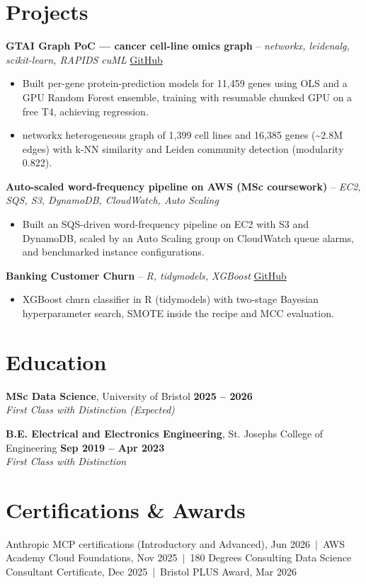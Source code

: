 \documentclass[a4paper,11pt]{article}
\begin{document}
\section{Projects}
\noindent\textbf{GTAI Graph PoC — cancer cell-line omics graph} -- \textit{networkx, leidenalg, scikit-learn, RAPIDS cuML} \hfill \href{https://github.com/Thiruvel-AP/GTAI-GraphPOC}{GitHub}
\begin{itemize}
  \item Built per-gene protein-prediction models for 11,459 genes using OLS and a GPU Random Forest ensemble, training with resumable chunked GPU on a free T4, achieving regression.
  \item networkx heterogeneous graph of 1,399 cell lines and 16,385 genes (\textasciitilde{}2.8M edges) with k-NN similarity and Leiden community detection (modularity 0.822).
\end{itemize}
\vspace{3pt}
\noindent\textbf{Auto-scaled word-frequency pipeline on AWS (MSc coursework)} -- \textit{EC2, SQS, S3, DynamoDB, CloudWatch, Auto Scaling} \hfill 
\begin{itemize}
  \item Built an SQS-driven word-frequency pipeline on EC2 with S3 and DynamoDB, scaled by an Auto Scaling group on CloudWatch queue alarms, and benchmarked instance configurations.
\end{itemize}
\vspace{3pt}
\noindent\textbf{Banking Customer Churn} -- \textit{R, tidymodels, XGBoost} \hfill \href{https://github.com/Thiruvel-AP/Banking-Customer-Churn-Prediction}{GitHub}
\begin{itemize}
  \item XGBoost churn classifier in R (tidymodels) with two-stage Bayesian hyperparameter search, SMOTE inside the recipe and MCC evaluation.
\end{itemize}

\section{Education}
\textbf{MSc Data Science}, University of Bristol \hfill \textbf{2025 – 2026}\\ \textit{First Class with Distinction (Expected)}\par
\vspace{3pt}
\textbf{B.E. Electrical and Electronics Engineering}, St. Joseph\textquotesingle{}s College of Engineering \hfill \textbf{Sep 2019 – Apr 2023}\\ \textit{First Class with Distinction}\par

\section{Certifications \& Awards}
Anthropic MCP certifications (Introductory and Advanced), Jun 2026 \,$|$\, AWS Academy Cloud Foundations, Nov 2025 \,$|$\, 180 Degrees Consulting Data Science Consultant Certificate, Dec 2025 \,$|$\, Bristol PLUS Award, Mar 2026
\end{document}
